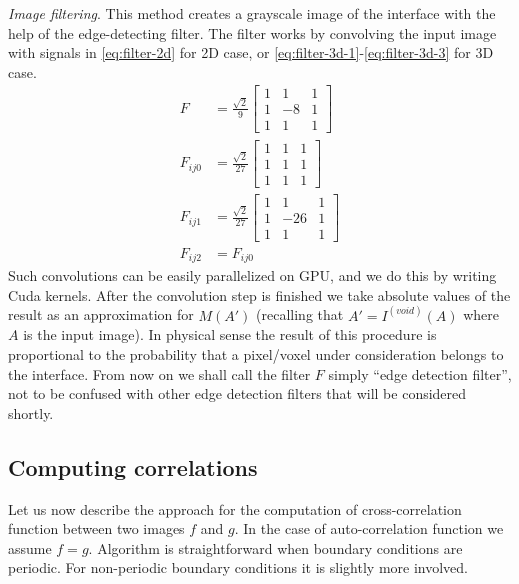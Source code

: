 \documentclass[reprint,amsmath,amssymb,aps,pre,showkeys,showpacs]{revtex4-1}
\begin{document}
\textit{Image filtering}. This method creates a grayscale image of the interface
with the help of the edge-detecting filter. The filter works by convolving the
input image with signals in \cref{eq:filter-2d} for 2D case, or
\cref{eq:filter-3d-1}-\cref{eq:filter-3d-3} for 3D case.
\begin{align}
  F &= \frac{\sqrt{2}}{9} \left[
    \begin{array}{ccc}
        1 & 1 & 1 \\
        1 & -8 & 1 \\
        1 & 1 & 1
      \end{array}
    \right] \label{eq:filter-2d} \\
  F_{ij0} &= \frac{\sqrt{2}}{27} \left[
    \begin{array}{ccc}
        1 & 1 & 1 \\
        1 & 1 & 1 \\
        1 & 1 & 1
    \end{array}
    \right] \label{eq:filter-3d-1} \\
  F_{ij1} &= \frac{\sqrt{2}}{27} \left[
    \begin{array}{ccc}
      1 & 1 & 1 \\
      1 & -26 & 1 \\
      1 & 1 & 1
    \end{array}
    \right] \label{eq:filter-3d-2} \\
  F_{ij2} &= F_{ij0} \label{eq:filter-3d-3}
\end{align}
Such convolutions can be easily parallelized on GPU, and we do this by writing Cuda kernels. After the convolution step is
finished we take absolute values of the result as an approximation for $M(A')$
(recalling that $A' = I^{(void)}(A)$ where $A$ is the input image). In physical
sense the result of this procedure is proportional to the probability that a pixel/voxel under consideration
belongs to the interface. From now on we shall call the filter $F$ simply
``edge detection filter'', not to be confused with other edge detection filters
that will be considered shortly.

\subsection{Computing correlations}
\label{sec:cross-comp}
Let us now describe the approach for the computation of cross-correlation
function between two images $f$ and $g$. In the case of auto-correlation function
we assume $f = g$. Algorithm is straightforward when boundary conditions are
periodic. For non-periodic boundary conditions it is slightly more involved.
\end{document}
